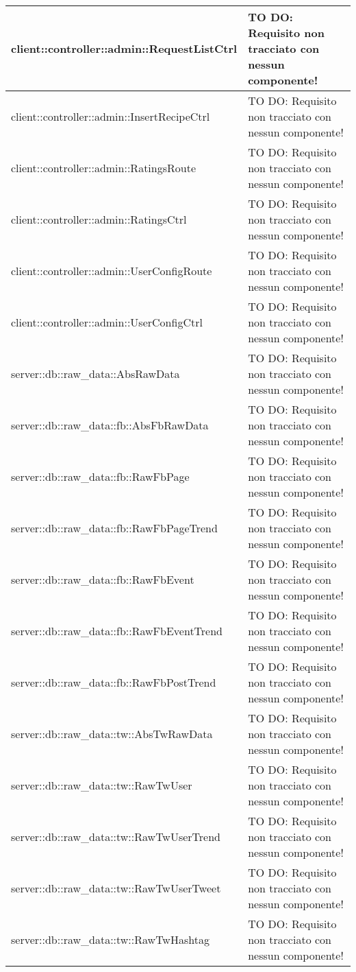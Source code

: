 \begin{center}
\begin{longtable}{| p{11cm} | p{2.5cm} |}
\hline
client::controller::admin::RequestListCtrl & TO DO: Requisito non tracciato con nessun componente! \\
\hline
client::controller::admin::InsertRecipeCtrl & TO DO: Requisito non tracciato con nessun componente! \\
\hline
client::controller::admin::RatingsRoute & TO DO: Requisito non tracciato con nessun componente! \\
\hline
client::controller::admin::RatingsCtrl & TO DO: Requisito non tracciato con nessun componente! \\
\hline
client::controller::admin::UserConfigRoute & TO DO: Requisito non tracciato con nessun componente! \\
\hline
client::controller::admin::UserConfigCtrl & TO DO: Requisito non tracciato con nessun componente! \\
\hline
server::db::raw\_data::AbsRawData & TO DO: Requisito non tracciato con nessun componente! \\
\hline
server::db::raw\_data::fb::AbsFbRawData & TO DO: Requisito non tracciato con nessun componente! \\
\hline
server::db::raw\_data::fb::RawFbPage & TO DO: Requisito non tracciato con nessun componente! \\
\hline
server::db::raw\_data::fb::RawFbPageTrend & TO DO: Requisito non tracciato con nessun componente! \\
\hline
server::db::raw\_data::fb::RawFbEvent & TO DO: Requisito non tracciato con nessun componente! \\
\hline
server::db::raw\_data::fb::RawFbEventTrend & TO DO: Requisito non tracciato con nessun componente! \\
\hline
server::db::raw\_data::fb::RawFbPostTrend & TO DO: Requisito non tracciato con nessun componente! \\
\hline
server::db::raw\_data::tw::AbsTwRawData & TO DO: Requisito non tracciato con nessun componente! \\
\hline
server::db::raw\_data::tw::RawTwUser & TO DO: Requisito non tracciato con nessun componente! \\
\hline
server::db::raw\_data::tw::RawTwUserTrend & TO DO: Requisito non tracciato con nessun componente! \\
\hline
server::db::raw\_data::tw::RawTwUserTweet & TO DO: Requisito non tracciato con nessun componente! \\
\hline
server::db::raw\_data::tw::RawTwHashtag & TO DO: Requisito non tracciato con nessun componente! \\

\end{longtable}
\end{center}
